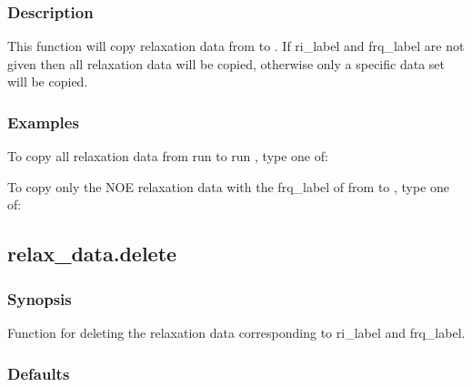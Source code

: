   
 \subsubsection{Description} 

 This function will copy relaxation data from  to .  If ri\_label and frq\_label are not given then all relaxation data will be copied, otherwise only a specific data set will be copied. 
  

  
 \subsubsection{Examples} 

 To copy all relaxation data from run  to run , type one of: 
  





 To copy only the NOE relaxation data with the frq\_label of  from  to , type one of: 
  



  

 \newpage 

 \subsection{relax\_data.delete} 

  
 \subsubsection{Synopsis} 

 Function for deleting the relaxation data corresponding to ri\_label and frq\_label. 
  

  
 \subsubsection{Defaults} 

